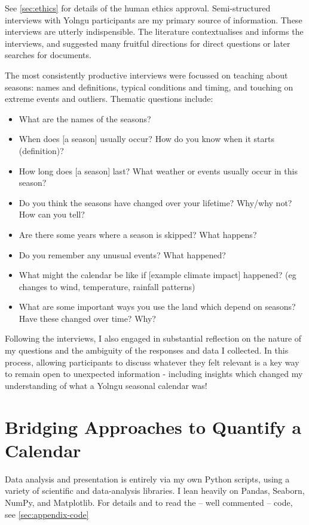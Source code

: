 See \autoref{sec:ethics} for details of the human ethics approval.
Semi-structured interviews with Yolngu participants are my primary source
of information.  These interviews are utterly indispensible.
The literature contextualises and informs the interviews, and suggested many fruitful
directions for direct questions or later searches for documents.

The most consistently productive interviews were focussed on teaching about
seasons: names and definitions, typical conditions and timing, and touching on
extreme events and outliers. Thematic questions include:
\begin{itemize}
\item What are the names of the seasons?
\item When does [a season] usually occur?  How do you know when it starts (definition)?
\item How long does [a season] last?  What weather or events usually occur in this season?
\item Do you think the seasons have changed over your lifetime?  Why/why not?  How can you tell?
\item Are there some years where a season is skipped?  What happens?
\item Do you remember any unusual events?  What happened?
\item What might the calendar be like if [example climate impact] happened? 
      (eg changes to wind, temperature, rainfall patterns) 
\item What are some important ways you use the land which depend on seasons?  Have these changed over time?  Why?
\end{itemize}

Following the interviews, I also engaged in substantial reflection on the nature
of my questions and the ambiguity of the responses and data I collected.
In this process, allowing participants to discuss whatever they felt relevant
is a key way to remain open to unexpected information - including insights
which changed my understanding of what a Yolngu seasonal calendar was!






\section{Bridging Approaches to Quantify a Calendar}


Data analysis and presentation is entirely via my own Python scripts,
using a variety of scientific and data-analysis libraries.
I lean heavily on Pandas, Seaborn, NumPy, and Matplotlib.
For details and to read the -- well commented -- code, see
\autoref{sec:appendix-code}


